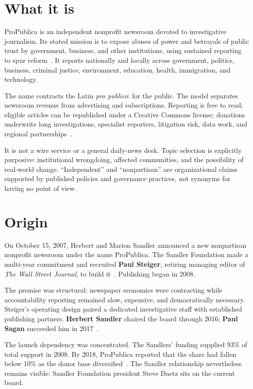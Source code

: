 \documentclass[10pt,letterpaper,twocolumn]{article}
\begin{document}
\section{What it is}

ProPublica is an independent nonprofit newsroom devoted to investigative journalism. Its stated mission is to expose abuses of power and betrayals of public trust by government, business, and other institutions, using sustained reporting to spur reform~\citep{ppabout}. It reports nationally and locally across government, politics, business, criminal justice, environment, education, health, immigration, and technology.

The name contracts the Latin \emph{pro publico}: for the public. The model separates newsroom revenue from advertising and subscriptions. Reporting is free to read; eligible articles can be republished under a Creative Commons license; donations underwrite long investigations, specialist reporters, litigation risk, data work, and regional partnerships~\citep{pprepublish,pp2025}.

It is not a wire service or a general daily-news desk. Topic selection is explicitly purposive: institutional wrongdoing, affected communities, and the possibility of real-world change. ``Independent'' and ``nonpartisan'' are organizational claims supported by published policies and governance practices, not synonyms for having no point of view.

\section{Origin}

On October 15, 2007, Herbert and Marion Sandler announced a new nonpartisan nonprofit newsroom under the name ProPublica. The Sandler Foundation made a multi-year commitment and recruited \textbf{Paul Steiger}, retiring managing editor of \emph{The Wall Street Journal}, to build it~\citep{pplaunch}. Publishing began in 2008.

The premise was structural: newspaper economics were contracting while accountability reporting remained slow, expensive, and democratically necessary. Steiger's operating design paired a dedicated investigative staff with established publishing partners. \textbf{Herbert Sandler} chaired the board through 2016; \textbf{Paul Sagan} succeeded him in 2017~\citep{ppsandler,ppleadership}.

The launch dependency was concentrated. The Sandlers' funding supplied 93\% of total support in 2008. By 2018, ProPublica reported that the share had fallen below 10\% as the donor base diversified~\citep{ppsandler}. The Sandler relationship nevertheless remains visible: Sandler Foundation president Steve Daetz sits on the current board.
\end{document}
